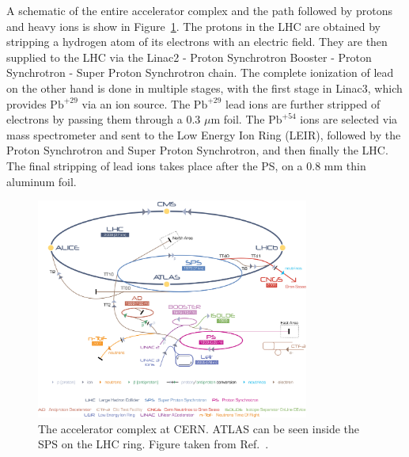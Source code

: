 A schematic of the entire accelerator complex and the path followed by protons and heavy ions is show in Figure~\ref{fig:cern}.
The protons in the LHC are obtained by stripping a hydrogen atom of its electrons with an electric field.
They are then supplied to the LHC via the Linac2 - Proton Synchrotron Booster - Proton Synchrotron - Super Proton Synchrotron chain.
The complete ionization of lead on the other hand is done in multiple stages, with the first stage in Linac3, which provides $\mathrm{Pb}^{+29}$ via an ion source.
The $\mathrm{Pb}^{+29}$ lead ions are further stripped of electrons by passing them through a 0.3 $\mu$m foil.
The $\mathrm{Pb}^{+54}$ ions are selected via mass spectrometer and sent to the Low Energy Ion Ring (LEIR), followed by the Proton Synchrotron and Super Proton Synchrotron, and then finally the LHC.
The final stripping of lead ions takes place after the PS, on a 0.8 mm thin aluminum foil.


\begin{figure}[ht]
	\centering
	\includegraphics[width=0.8\textwidth]{figures/setup/cern.jpg} %
	\caption{The accelerator complex at CERN.
ATLAS can be seen inside the SPS on the LHC ring.
Figure taken from Ref.~\cite{Christiane:1260465}.}
	\label{fig:cern}%
\end{figure}


